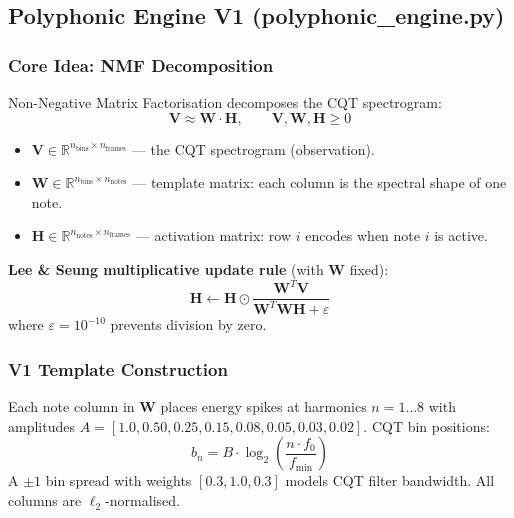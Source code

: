 \documentclass[12pt, a4paper]{article}
\begin{document}
\subsection{Polyphonic Engine V1 (polyphonic\_engine.py)}

\subsubsection{Core Idea: NMF Decomposition}

Non-Negative Matrix Factorisation decomposes the CQT spectrogram:
\begin{equation}
  \mathbf{V} \approx \mathbf{W}\cdot\mathbf{H}, \qquad
  \mathbf{V},\mathbf{W},\mathbf{H} \geq 0
\end{equation}
\begin{itemize}[leftmargin=2em]
  \item $\mathbf{V}\in\mathbb{R}^{n_{\text{bins}}\times n_{\text{frames}}}$
        --- the CQT spectrogram (observation).
  \item $\mathbf{W}\in\mathbb{R}^{n_{\text{bins}}\times n_{\text{notes}}}$
        --- template matrix: each column is the spectral shape of one note.
  \item $\mathbf{H}\in\mathbb{R}^{n_{\text{notes}}\times n_{\text{frames}}}$
        --- activation matrix: row $i$ encodes when note $i$ is active.
\end{itemize}

\textbf{Lee \& Seung multiplicative update rule} (with $\mathbf{W}$ fixed):
\begin{equation}
  \mathbf{H} \leftarrow \mathbf{H} \odot
  \frac{\mathbf{W}^{T}\mathbf{V}}
       {\mathbf{W}^{T}\mathbf{W}\mathbf{H} + \varepsilon}
\end{equation}
where $\varepsilon = 10^{-10}$ prevents division by zero.

\subsubsection{V1 Template Construction}

Each note column in $\mathbf{W}$ places energy spikes at harmonics
$n = 1\ldots 8$ with amplitudes $A = [1.0, 0.50, 0.25, 0.15, 0.08, 0.05, 0.03, 0.02]$.
CQT bin positions:
\begin{equation}
  b_n = B \cdot \log_2\!\left(\frac{n \cdot f_0}{f_{\min}}\right)
\end{equation}
A $\pm1$ bin spread with weights $[0.3, 1.0, 0.3]$ models CQT filter
bandwidth. All columns are $\ell_2$-normalised.
\end{document}

